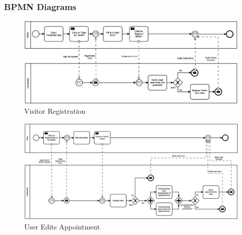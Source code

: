 \documentclass[12pt]{article}
\begin{document}
\subsubsection{BPMN Diagrams}

\begin{figure}[H]
        \includegraphics[scale=0.55, angle=-90, origin=c]{BPMNvisitorRegistration.png}
        \centering
        \caption{Visitor Registration}
    \label{fig:visitorRegistrationBPMN}
\end{figure}

\begin{figure}[H]
        \includegraphics[scale=0.46, angle=-90, origin=c]{BPMNeditAppointment.png}
        \centering
        \caption{User Edits Appointment}
    \label{fig:visitorRegistrationBPMN}
\end{figure}
\end{document}
